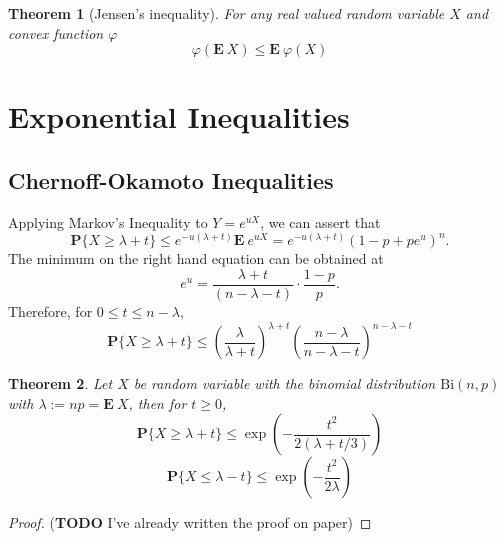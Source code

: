 \documentclass[12pt]{exam}
\def\E{\ensuremath{\mathbf{E}}\:}
\def\P{\ensuremath{\mathbf{P}}}
\def\Bi{\ensuremath{\mathrm{Bi}}}
\newtheorem{theorem}{Theorem}[section]
\theoremstyle{remark}
\begin{document}
\begin{theorem}[Jensen's inequality]\label{jensen}
  For any real valued random variable $X$ and convex function $\varphi$
  \[ \varphi(\E X) \leq \E \varphi(X) \] 
\end{theorem}

\section{Exponential Inequalities}


\subsection{Chernoff-Okamoto Inequalities}


Applying Markov's Inequality to $Y = e^{uX}$, we can assert that
  \[
    \P\{X \geq \lambda + t\} \leq e^{-u(\lambda+t)} \E e^{uX} = e^{-u(\lambda+ t)} {(1-p + p e^{u})}^n. 
  \] 
  The minimum on the right hand equation can be obtained at
  \[ e^{u} = \frac{\lambda+t}{(n-\lambda-t)} \cdot \frac{1-p}{p}. \]
  Therefore, for $0 \leq t \leq n-\lambda$,
  \begin{equation}\label{co:1}
    \P\{X \geq \lambda + t\} \leq {\left(\frac{\lambda}{\lambda+t}\right)}^{\lambda + t} {\left(\frac{n-\lambda}{n-\lambda-t}\right)}^{n - \lambda - t}
  \end{equation}

\begin{theorem}\label{co:T1}
  Let $X$ be random variable with the binomial distribution $\Bi(n,p)$ with $\lambda := np = \E X$, then for $t \geq 0$,
  \begin{equation}\label{co:2}
    \P\{X \geq \lambda + t\} \leq \exp\left(- \frac{t^2}{2(\lambda+t/3)}\right)
  \end{equation}
  \begin{equation}\label{co:3}
    \P\{X \leq \lambda - t\} \leq \exp\left(- \frac{t^2}{2\lambda}\right)
  \end{equation}
\end{theorem}

\begin{proof}
  (\textbf{TODO} I've already written the proof on paper)
\end{proof}
\end{document}
